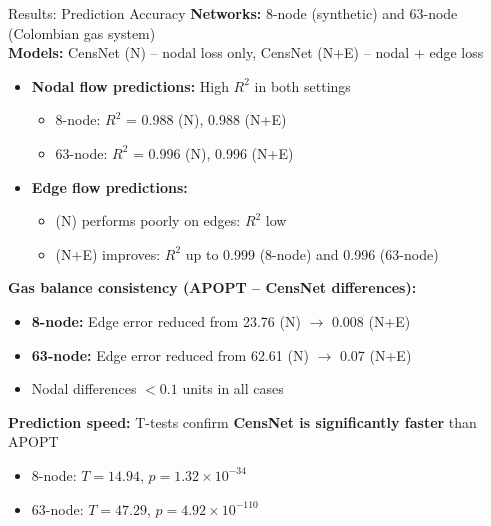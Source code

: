 \documentclass[hyperref={colorlinks,citecolor=blue,linkcolor=blue,urlcolor=blue}]{beamer}
\begin{document}
\begin{frame}{Results: Prediction Accuracy}
\footnotesize 
\textbf{Networks:} 8-node (synthetic) and 63-node (Colombian gas system)  
\\
\textbf{Models:} CensNet (N) – nodal loss only, CensNet (N+E) – nodal + edge loss

\begin{itemize}
    \footnotesize 
    \item \textbf{Nodal flow predictions:} High $R^2$ in both settings
        \begin{itemize}
            \footnotesize 
            \item 8-node: $R^2$ = 0.988 (N), 0.988 (N+E)
            \item 63-node: $R^2$ = 0.996 (N), 0.996 (N+E)
        \end{itemize}
    \item \textbf{Edge flow predictions:} 
        \begin{itemize}
            \footnotesize 
            \item (N) performs poorly on edges: $R^2$ low
            \item (N+E) improves: $R^2$ up to 0.999 (8-node) and 0.996 (63-node)
        \end{itemize}
\end{itemize}

\textbf{Gas balance consistency (APOPT – CensNet differences):}
\begin{itemize}
    \footnotesize 
    \item \textbf{8-node:} Edge error reduced from 23.76 (N) $\rightarrow$ 0.008 (N+E)
    \item \textbf{63-node:} Edge error reduced from 62.61 (N) $\rightarrow$ 0.07 (N+E)
    \item Nodal differences $< 0.1$ units in all cases
\end{itemize}

\textbf{Prediction speed:}  
T-tests confirm \textbf{CensNet is significantly faster} than APOPT
\begin{itemize}
    \footnotesize 
    \item 8-node: $T=14.94$, $p=1.32\times10^{-34}$
    \item 63-node: $T=47.29$, $p=4.92\times10^{-110}$
\end{itemize}

\end{frame}
\end{document}
